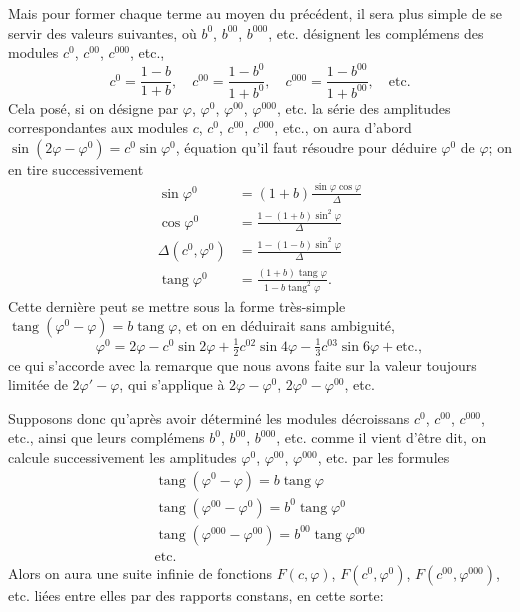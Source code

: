 \documentclass{article}
\begin{document}
Mais pour former chaque terme au moyen du précédent, il sera plus simple de se servir des valeurs suivantes, où $b^{0}$, $b^{00}$, $b^{000}$, etc. désignent les complémens des modules $c^{0}$, $c^{00}$, $c^{000}$, etc.,
\[ c^{0}=\frac{1-b}{1+b},\quad c^{00}=\frac{1-b^{0}}{1+b^{0}},\quad c^{000}=\frac{1-b^{00}}{1+b^{00}},\quad\text{etc.} \]
Cela posé, si on désigne par $\varphi$, $\varphi^{0}$, $\varphi^{00}$, $\varphi^{000}$, etc. la série des amplitudes correspondantes aux modules $c$, $c^{0}$, $c^{00}$, $c^{000}$, etc., on aura d'abord $\sin(2\varphi-\varphi^{0})=c^{0}\sin\varphi^{0}$, équation qu'il faut résoudre pour déduire $\varphi^{0}$ de $\varphi$; on en tire successivement
\[ \begin{aligned} \sin\varphi^{0}&=(1+b)\frac{\sin\varphi\cos\varphi}{\Delta}\\ \cos\varphi^{0}&=\frac{1-(1+b)\sin^{2}\varphi}{\Delta}\\ \Delta(c^{0},\varphi^{0})&=\frac{1-(1-b)\sin^{2}\varphi}{\Delta}\\ \operatorname{tang}\varphi^{0}&=\frac{(1+b)\operatorname{tang}\varphi}{1-b\operatorname{tang}^{2}\varphi}. \end{aligned} \]
Cette dernière peut se mettre sous la forme très-simple $\operatorname{tang}(\varphi^{0}-\varphi)=b\operatorname{tang}\varphi$, et on en déduirait sans ambiguité,
\[ \varphi^{0}=2\varphi-c^{0}\sin2\varphi+\tfrac{1}{2}c^{02}\sin4\varphi-\tfrac{1}{3}c^{03}\sin6\varphi+\text{etc.}, \]
ce qui s'accorde avec la remarque que nous avons faite sur la valeur toujours limitée de $2\varphi'-\varphi$, qui s'applique à $2\varphi-\varphi^{0}$, $2\varphi^{0}-\varphi^{00}$, etc.

Supposons donc qu'après avoir déterminé les modules décroissans $c^{0}$, $c^{00}$, $c^{000}$, etc., ainsi que leurs complémens $b^{0}$, $b^{00}$, $b^{000}$, etc. comme il vient d'être dit, on calcule successivement les amplitudes $\varphi^{0}$, $\varphi^{00}$, $\varphi^{000}$, etc. par les formules
\[ \begin{gathered} \operatorname{tang}(\varphi^{0}-\varphi)=b\operatorname{tang}\varphi\\ \operatorname{tang}(\varphi^{00}-\varphi^{0})=b^{0}\operatorname{tang}\varphi^{0}\\ \operatorname{tang}(\varphi^{000}-\varphi^{00})=b^{00}\operatorname{tang}\varphi^{00}\\ \text{etc.} \end{gathered} \]
Alors on aura une suite infinie de fonctions $F(c,\varphi)$, $F(c^{0},\varphi^{0})$, $F(c^{00},\varphi^{000})$, etc. liées entre elles par des rapports constans, en cette sorte:
\end{document}
